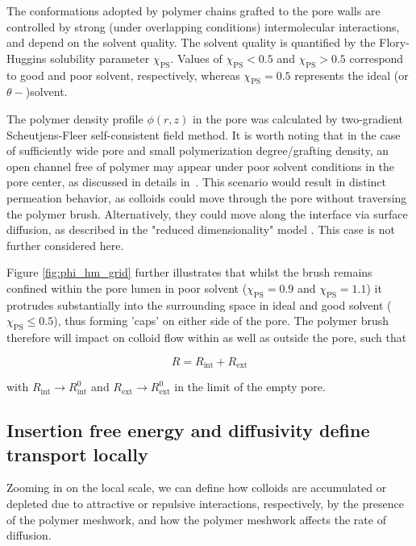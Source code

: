 \documentclass[12pt, a4paper]{article}
\begin{document}
The conformations adopted by polymer chains grafted to the pore walls are controlled by strong (under overlapping conditions) intermolecular interactions, and depend on the solvent quality. 
The solvent quality is quantified by the Flory-Huggins solubility parameter $\chi_{\text{PS}}$. 
Values of $\chi_{\text{PS}}<0.5$ and $\chi_{\text{PS}}>0.5$ correspond to good and poor solvent, respectively, whereas $\chi_{\text{PS}}=0.5$ represents the ideal (or $\theta-$)solvent.

The polymer density profile $\phi(r,z)$ in the pore was calculated by two-gradient Scheutjens-Fleer self-consistent field method.
It is worth noting that in the case of sufficiently wide pore and small polymerization degree/grafting density, 
an open channel free of polymer may appear under poor solvent conditions in the pore center, as discussed in details in~\cite{Laktionov2021}. 
This scenario would result in distinct permeation behavior, as colloids could move through the pore without traversing the polymer brush. Alternatively, they could move along the interface via surface diffusion, as described in the "reduced dimensionality" model \cite{Peters2005, Peters2009}. This case is not further considered here.

Figure \ref{fig:phi_hm_grid} further illustrates that whilst the brush remains confined within the pore lumen in poor solvent ($\chi_{\text{PS}}=0.9$ and $\chi_{\text{PS}}=1.1$) 
it protrudes substantially into the surrounding space in ideal and good solvent ($\chi_{\text{PS}}\le0.5$), thus forming 'caps' on either side of the pore.  
The polymer brush therefore will impact on colloid flow within as well as outside the pore, such that

\begin{equation}
    R=R_{\text{int}}+R_{\text{ext}}
    \label{eq:R_tot_tot}
\end{equation}
    
\noindent with $R_{\text{int}}\rightarrow R_{\text{int}}^{0}$ and $R_{\text{ext}}\rightarrow R_{\text{ext}}^{0}$ in the limit of the empty pore. 


\subsection{Insertion free energy and diffusivity define transport locally}

Zooming in on the local scale, we can define how colloids are accumulated or depleted due to attractive or repulsive interactions, respectively, by the presence of the polymer meshwork, 
and how the polymer meshwork affects the rate of diffusion.
\end{document}
